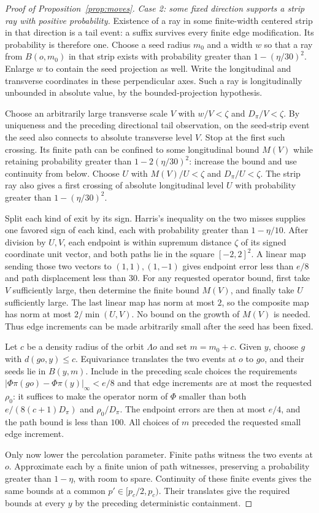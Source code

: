 \documentclass[11pt]{article}
\theoremstyle{definition}
\newcommand{\pc}{p_c}
\begin{document}
\begin{proof}[Proof of Proposition~\ref{prop:moves}]
\emph{Case 2: some fixed direction supports a strip ray with positive
probability.} Existence of a ray in some finite-width centered strip
in that direction is a tail event: a suffix survives every finite
edge modification. Its probability is therefore one. Choose a seed
radius $m_0$ and a width $w$ so that a ray from $B(o,m_0)$ in that
strip exists with probability greater than $1-(\eta/30)^2$.
Enlarge $w$ to contain the seed projection as well. Write the
longitudinal and transverse coordinates in these perpendicular axes.
Such a ray is longitudinally unbounded in absolute value, by the
bounded-projection hypothesis.

Choose an arbitrarily large transverse scale $V$ with
$w/V<\zeta$ and $D_\pi/V<\zeta$.
By uniqueness and the preceding directional tail observation, on
the seed-strip event the seed also connects to absolute transverse
level $V$. Stop at the first such crossing. Its finite path can be
confined to some longitudinal bound $M(V)$ while retaining probability
greater than $1-2(\eta/30)^2$: increase the bound and use continuity
from below. Choose $U$ with $M(V)/U<\zeta$ and $D_\pi/U<\zeta$.
The strip ray also gives a
first crossing of absolute longitudinal level $U$ with probability
greater than $1-(\eta/30)^2$.

Split each kind of exit by its sign. Harris's inequality on the two
misses supplies one favored sign of each kind, each with probability
greater than $1-\eta/10$. After division by $U,V$, each endpoint is
within supremum distance $\zeta$ of its signed coordinate unit vector,
and both paths lie in the square $[-2,2]^2$.
A linear map sending those two vectors to $(1,1),(1,-1)$ gives
endpoint error less than $e/8$ and path displacement less than $30$.
For any requested operator bound, first take $V$ sufficiently large,
then determine the finite bound $M(V)$, and finally take $U$ sufficiently
large. The last linear map has norm at most $2$, so the composite map
has norm at most $2/\min(U,V)$. No bound on the growth of $M(V)$ is
needed. Thus edge increments can be made arbitrarily small after
the seed has been fixed.

Let $c$ be a density radius of the orbit $\Lambda o$ and set
$m=m_0+c$. Given $y$, choose $g$ with $d(go,y)\le c$.
Equivariance translates the two events at $o$ to $go$, and their seeds
lie in $B(y,m)$. Include in the preceding scale choices the requirements
$|\Phi\pi(go)-\Phi\pi(y)|_\infty<e/8$ and that edge increments
are at most the requested $\rho_0$: it suffices to make the operator norm
of $\Phi$ smaller than both $e/(8(c+1)D_\pi)$ and $\rho_0/D_\pi$.
The endpoint errors are then at
most $e/4$, and the path bound is less than $100$. All choices of
$m$ preceded the requested small edge increment.

Only now lower the percolation parameter. Finite paths witness the
two events at $o$. Approximate each by a finite union of path witnesses,
preserving a probability greater than $1-\eta$, with room to spare.
Continuity of these finite events gives the same bounds at a common
$p'\in[\pc/2,\pc)$. Their translates give the required bounds at
every $y$ by the preceding deterministic containment.
\end{proof}
\end{document}
